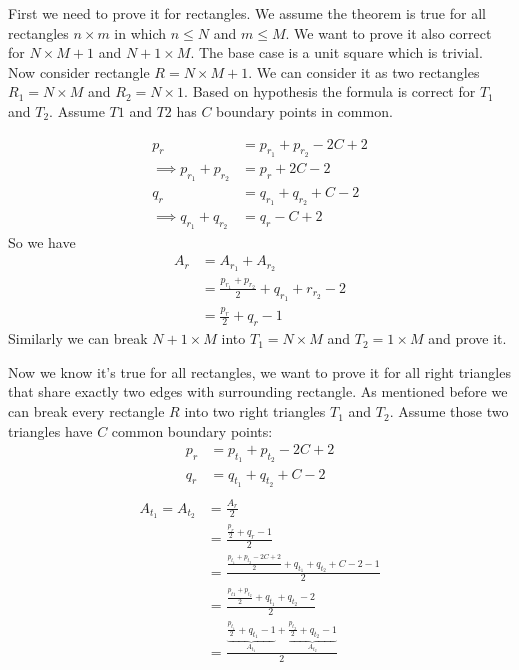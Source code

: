 \documentclass{book}
\begin{document}
	First we need to prove it for rectangles. We assume the theorem is true for all rectangles $n \times m$ in which $n \le N$ and $m \le M$. We want to prove it also correct for $N \times M +1$ and $N + 1 \times M$. The base case is a unit square which is trivial. Now consider rectangle $R = N \times M + 1$. We can consider it as two rectangles $R_1 = N \times M$ and $R_2 = N \times 1$. Based on hypothesis the formula is correct for $T_1$ and $T_2$. Assume $T1$ and $T2$ has $C$ boundary points in common.
	
	\begin{equation*}
		\begin{split}
			p_r &= p_{r_1} + p_{r_2} -2C + 2 \\
			\implies p_{r_1} + p_{r_2} &= p_r + 2C - 2 \\
			q_r &= q_{r_1} + q_{r_2} + C - 2 \\
			\implies q_{r_1} + q_{r_2} &= q_r - C + 2
		\end{split}
	\end{equation*}
	So we have
	\begin{equation*}
		\begin{split}
			A_r &= A_{r_1} + A_{r_2} \\
			&= \frac{p_{r_1} + p_{r_2}}{2} + q_{r_1} + r_{r_2} - 2 \\
			&= \frac{p_r}{2} + q_r - 1
		\end{split}
	\end{equation*}
	Similarly we can break $N + 1 \times M$ into $T_1 = N \times M$ and $T_2 = 1 \times M$ and prove it.
	\par Now we know it's true for all rectangles, we want to prove it for all right triangles that share exactly two edges with surrounding rectangle. As mentioned before we can break every rectangle $R$ into two right triangles $T_1$ and $T_2$. Assume those two triangles have $C$ common boundary points:
	\begin{equation*}
		\begin{split}
			p_r &= p_{t_1} + p_{t_2} - 2C + 2 \\
			q_r &= q_{t_1} + q_{t_2} + C - 2 \\
		\end{split}
	\end{equation*}
	\begin{equation*}
		\begin{split}
			A_{t_1} = A_{t_2} &= \frac{A_r}{2} \\
			&= \frac{\frac{p_r}{2} + q_r - 1}{2} \\
			&= \frac{\frac{p_{t_1} + p_{t_2} - 2C + 2}{2} + q_{t_1} + q_{t_2} + C - 2 - 1}{2} \\
			&= \frac{\frac{p_{t1} + p_{t_2}}{2} + q_{t_1} + q_{t_2} - 2}{2} \\
			&= \frac{\underbrace{\frac{p_{t_1}}{2} + q_{t_1} - 1}_{A_{t_1}} + \underbrace{\frac{p_{t_2}}{2} + q_{t_2} - 1}_{A_{t_2}}}{2}
		\end{split}
	\end{equation*}
\end{document}
